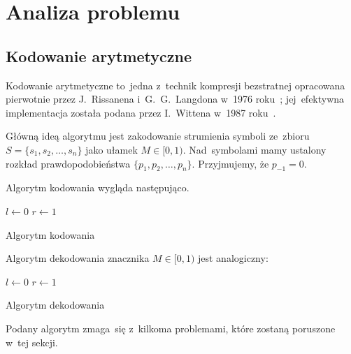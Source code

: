 \documentclass[../../praca.tex]{subfiles}
\begin{document}
\chapter{Analiza problemu}

\section{Kodowanie arytmetyczne}

Kodowanie arytmetyczne to~jedna z~technik kompresji bezstratnej
opracowana pierwotnie przez J.~Rissanena i~G.~G.~Langdona w~1976 roku~\cite{Rissanen:AC};
jej~efektywna implementacja została podana przez I.~Wittena w~1987 roku~\cite{Witten:AC}.

Główną ideą algorytmu jest zakodowanie strumienia symboli 
ze~zbioru \( S = \{ s_1, s_2, \dotsc, s_n \} \) jako ułamek \( M \in [0, 1) \).
Nad~symbolami mamy ustalony rozkład prawdopodobieństwa \( \{ p_1, p_2, \dotsc, p_n \} \).
Przyjmujemy, że $p_{-1} = 0$.

Algorytm kodowania wygląda następująco.

\begin{pseudokod}

  \Output{znacznik $M \in [0, 1)$}
  \BlankLine

  $l \gets 0$\;
  $r \gets 1$\;
  \caption{Algorytm kodowania}
\end{pseudokod}

Algorytm dekodowania znacznika \( M \in [0, 1) \) jest analogiczny:
\begin{pseudokod}

  \Input{znacznik $M \in [0, 1)$}
  
  $l \gets 0$\;
  $r \gets 1$\;

  \caption{Algorytm dekodowania}
\end{pseudokod}


Podany algorytm zmaga~się z~kilkoma problemami, które zostaną poruszone w~tej sekcji.
\end{document}
